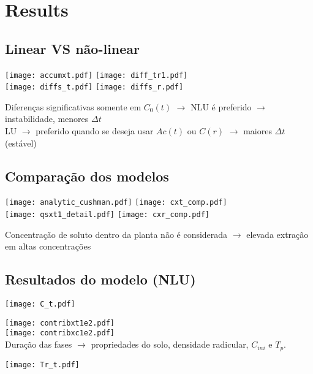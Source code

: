 \section{Results}

\subsection{Linear VS não-linear}
\begin{frame}
  \texttt{[image: accumxt.pdf]}
  \texttt{[image: diff\_tr1.pdf]}\\[.5cm]
  
  \texttt{[image: diffs\_t.pdf]}
  \texttt{[image: diffs\_r.pdf]}

  Diferenças significativas somente em $C_0(t)$ $\rightarrow$ NLU é preferido $\rightarrow$ instabilidade, menores $\Delta t$\\
  LU $\rightarrow$ preferido quando se deseja usar $Ac(t)$ ou $C(r)$ $\rightarrow$ maiores $\Delta t$ (estável)
\end{frame}

\subsection{Comparação dos modelos}
\begin{frame}
  \texttt{[image: analytic\_cushman.pdf]}
  \texttt{[image: cxt\_comp.pdf]}\\[.5cm]
  \texttt{[image: qsxt1\_detail.pdf]}
  \texttt{[image: cxr\_comp.pdf]}

  Concentração de soluto dentro da planta não é considerada $\rightarrow$ elevada extração em altas concentrações
\end{frame}

\subsection{Resultados do modelo (NLU)}
\begin{frame}
  \texttt{[image: C\_t.pdf]}
\end{frame}
\begin{frame}
  \texttt{[image: contribxt1e2.pdf]}\\[.5cm]
  \texttt{[image: contribxc1e2.pdf]}\\
  Duração das fases $\rightarrow$ propriedades do solo, densidade radicular, $C_{ini}$ e $T_p$.
\end{frame}
\begin{frame}
  \texttt{[image: Tr\_t.pdf]}
\end{frame}


